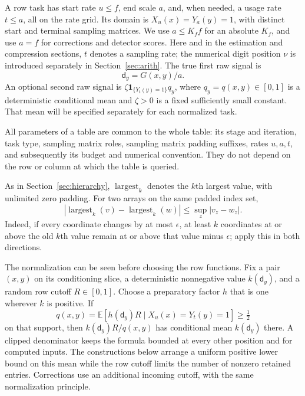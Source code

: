 A row task has start rate $u\le f$, end scale $a$, and, when needed, a
usage rate $t\le a$, all on the rate grid.  Its domain is
$X_u(x)=Y_a(y)=1$, with distinct start and terminal sampling matrices.  We use
$a\le K_f f$ for an absolute $K_f$, and use $a=f$ for corrections and
detector scores.  Here and in the estimation and compression sections,
$t$ denotes a sampling rate; the numerical digit position $\nu$ is introduced
separately in Section~\ref{sec:arith}.  The true first raw signal is
\begin{equation}
 \mathsf{d}_y=G(x,y)/a.
 \label{eq:atom-first-signal}
\end{equation}
An optional second raw signal is
$\zeta\mathbf1_{\{Y_t(y)=1\}}q_y$, where $q_y=q(x,y)\in[0,1]$ is a
deterministic conditional mean and $\zeta>0$ is a fixed sufficiently small
constant.  That mean will be specified separately for each normalized task.

All parameters of a table are common to the whole table: its stage and
iteration, task type, sampling matrix roles, sampling matrix padding suffixes, rates
$u,a,t$, and subsequently its budget and numerical convention.  They do
not depend on the row or column at which the table is queried.

As in Section~\ref{sec:hierarchy}, $\operatorname{largest}_k$ denotes the
$k$th largest value, with unlimited zero padding.  For two arrays on the same padded index set,
\begin{equation}
 |\operatorname{largest}_k(v)-\operatorname{largest}_k(w)|
 \le\sup_z|v_z-w_z|.
 \label{eq:atom-rank-lipschitz}
\end{equation}
Indeed, if every coordinate changes by at most $\epsilon$, at least $k$
coordinates at or above the old $k$th value remain at or above that value
minus $\epsilon$; apply this in both directions.

The normalization can be seen before choosing the row functions.  Fix a
pair $(x,y)$ on its conditioning slice, a deterministic nonnegative value
$k(\mathsf{d}_y)$, and a random row cutoff $R\in[0,1]$.  Choose a preparatory factor
$h$ that is one wherever $k$ is positive.  If
\[
 q(x,y)=\mathbb E[h(\mathsf{d}_y)R\mid X_u(x)=Y_t(y)=1]\ge\tfrac12
\]
on that support, then $k(\mathsf{d}_y)R/q(x,y)$ has conditional mean $k(\mathsf{d}_y)$
there.  A clipped denominator keeps the formula bounded at every other
position and for computed inputs.  The constructions below arrange a
uniform positive lower bound on this mean while the row cutoff limits the
number of nonzero retained entries.  Corrections use an additional incoming
cutoff, with the same normalization principle.

